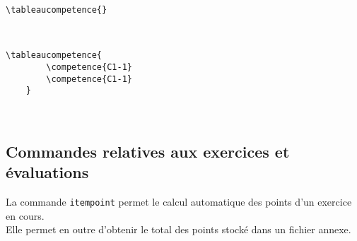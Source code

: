 \begin{tcolorbox}[colback=yellow!10!white, title=Exemple d'utilisation pour \texttt{tableaucompetence}]
\begin{minipage}{0.32\textwidth}
\begin{lstlisting}[breaklines]
\tableaucompetence{}
\end{lstlisting}
\end{minipage}
\hfill
\begin{minipage}{0.65\textwidth}
\phantom{a}\\
\tableaucompetence{}
\end{minipage}
\end{tcolorbox}



\begin{tcolorbox}[colback=yellow!10!white, title=Exemple d'utilisation pour \texttt{competence}]
\begin{minipage}{0.32\textwidth}
\begin{lstlisting}[breaklines]
    \tableaucompetence{
        \competence{C1-1}
        \competence{C1-1}
    }
\end{lstlisting}
\end{minipage}
\hfill
\begin{minipage}{0.65\textwidth}
\phantom{a}\\
\end{minipage}
\end{tcolorbox}

\subsection{Commandes relatives aux exercices et évaluations}

La commande  \texttt{itempoint} permet le calcul automatique des points d'un exercice en cours. \\
Elle permet en outre d'obtenir le total des points stocké dans un fichier annexe.\\

